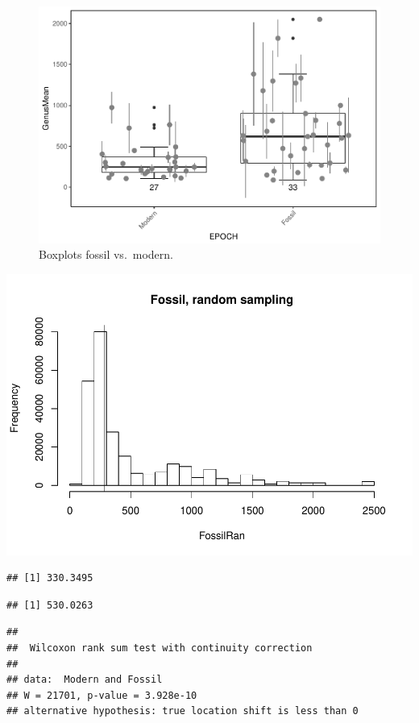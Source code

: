 \documentclass[]{article}
\begin{document}
\begin{figure}[htbp]
\centering
\includegraphics{MA_JJ_files/figure-latex/BPMF-1.pdf}
\caption{Boxplots fossil vs.~modern.}
\end{figure}

\includegraphics{MA_JJ_files/figure-latex/RSFM-1.pdf}

\begin{verbatim}
## [1] 330.3495
\end{verbatim}

\begin{verbatim}
## [1] 530.0263
\end{verbatim}

\begin{verbatim}
## 
##  Wilcoxon rank sum test with continuity correction
## 
## data:  Modern and Fossil
## W = 21701, p-value = 3.928e-10
## alternative hypothesis: true location shift is less than 0
\end{verbatim}
\end{document}
